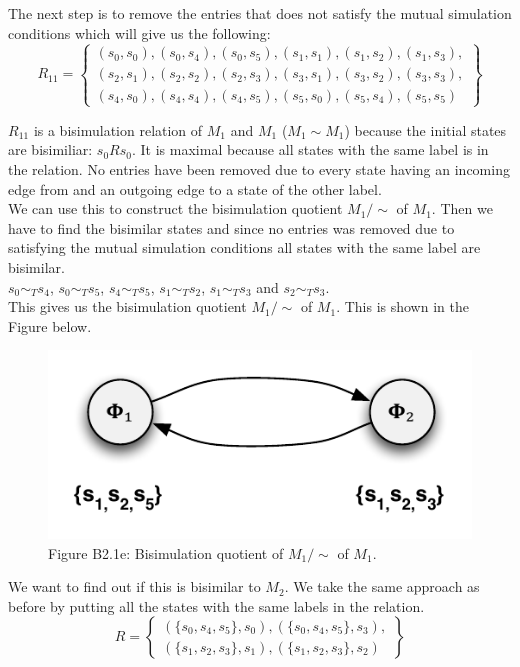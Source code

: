 \documentclass[12pt]{report}
\begin{document}
The next step is to remove the entries that does not satisfy the mutual simulation conditions which will give us the following:
$$R_{11} = \left\{
	\begin{array}{c}
	    (s_0,s_0),(s_0,s_4),(s_0,s_5),(s_1,s_1),(s_1,s_2),(s_1,s_3),\\
	    (s_2,s_1),(s_2,s_2),(s_2,s_3),(s_3,s_1),(s_3,s_2),(s_3,s_3), \\
	    (s_4,s_0),(s_4,s_4),(s_4,s_5),(s_5,s_0),(s_5,s_4),(s_5,s_5)
	\end{array}
\right\}$$

$R_{11}$ is a bisimulation relation of $M_1$ and $M_1$ ($M_1 \sim M_1$) because the initial states are bisimiliar: $s_0 R s_0$. It is maximal because all states with the same label is in the relation. No entries have been removed due to every state having an incoming edge from and an outgoing edge to a state of the other label.\\
We can use this to construct the bisimulation quotient $M_1 / \sim$ of $M_1$. Then we have to find the bisimilar states and since no entries was removed due to satisfying the mutual simulation conditions all states with the same label are bisimilar.\\
$s_0 \sim_T s_4$, $s_0 \sim_T s_5$, $s_4 \sim_T s_5$, $s_1 \sim_T s_2$, $s_1 \sim_T s_3$ and $s_2 \sim_T s_3$.\\
This gives us the bisimulation quotient $M_1 / \sim$ of $M_1$. This is shown in the Figure below.\\

\begin{figure}[H]
	\centering
	\includegraphics[scale=0.75]{../GFX/Answer-b2-1e.pdf}\\
	Figure B2.1e: Bisimulation quotient of $M_1 / \sim$ of $M_1$.
\end{figure}

We want to find out if this is bisimilar to $M_2$. We take the same approach as before by putting all the states with the same labels in the relation.
$$R = \left\{
	\begin{array}{c}
	    (\{s_0,s_4,s_5\},s_0),(\{s_0,s_4,s_5\},s_3),\\
	    (\{s_1,s_2,s_3\},s_1), (\{s_1,s_2,s_3\},s_2)
	\end{array}
\right\}$$
\end{document}
